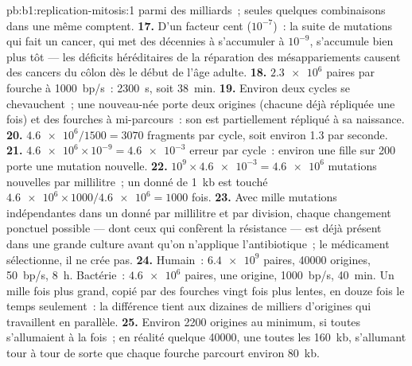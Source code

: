 \begin{solution}{pb:b1:replication-mitosis:1}
parmi des milliards~; seules quelques combinaisons dans une même 
comptent.
\textbf{17.} D'un facteur cent ($10^{-7}$)~: la suite de mutations qui
fait un cancer, qui met des décennies à s'accumuler à $10^{-9}$,
s'accumule bien plus tôt --- les déficits héréditaires de la réparation
des mésappariements causent des cancers du côlon dès le début de l'âge
adulte.
\textbf{18.} $\num{2.3e6}$ paires par fourche à \qty{1000}{bp/s}~:
\qty{2300}{s}, soit \qty{38}{min}.
\textbf{19.} Environ deux cycles se chevauchent~; une 
nouveau-née porte deux origines (chacune déjà répliquée une fois) et des
fourches à mi-parcours~: son  est partiellement répliqué à sa
naissance.
\textbf{20.} $\num{4.6e6}/1500 = 3070$ fragments par cycle, soit environ
1.3 par seconde.
\textbf{21.} $\num{4.6e6}\times 10^{-9} = \num{4.6e-3}$ erreur par
cycle~: environ une  fille sur 200 porte une mutation nouvelle.
\textbf{22.} $10^9\times\num{4.6e-3} = \num{4.6e6}$ mutations nouvelles
par millilitre~; un  donné de \qty{1}{kb} est touché $\num{4.6e6}\times
1000/\num{4.6e6} = 1000$ fois.
\textbf{23.} Avec mille mutations indépendantes dans un  donné par
millilitre et par division, chaque changement ponctuel possible --- dont
ceux qui confèrent la résistance --- est déjà présent dans une grande
culture avant qu'on n'applique l'antibiotique~; le médicament
sélectionne, il ne crée pas.
\textbf{24.} Humain~: $\num{6.4e9}$ paires, \num{40000} origines,
\qty{50}{bp/s}, \qty{8}{h}. Bactérie~: $\num{4.6e6}$ paires, une
origine, \qty{1000}{bp/s}, \qty{40}{min}. Un  mille fois plus
grand, copié par des fourches vingt fois plus lentes, en douze fois le
temps seulement~: la différence tient aux dizaines de milliers
d'origines qui travaillent en parallèle.
\textbf{25.} Environ \num{2200} origines au minimum, si toutes
s'allumaient à la fois~; en réalité quelque \num{40000}, une toutes les
\qty{160}{kb}, s'allumant tour à tour de sorte que chaque fourche
parcourt environ \qty{80}{kb}.
\end{solution}
